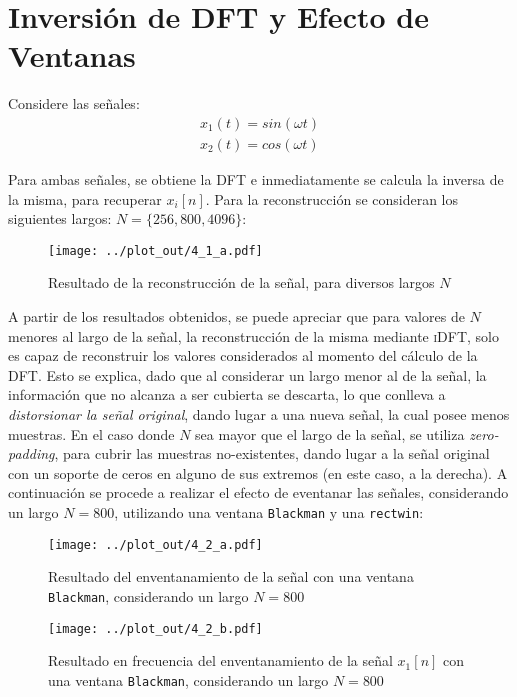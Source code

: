\section{Inversión de DFT y Efecto de Ventanas}
	Considere las señales:
	\begin{align}
		x_{1}(t) = sin( \omega t)\\
		x_{2}(t) = cos( \omega t) 
	\end{align}
	
	Para ambas señales, se obtiene la \textsc{DFT} e inmediatamente se calcula la inversa de la misma, para recuperar $x_{i}[n]$. Para la reconstrucción se consideran los siguientes largos: $N = \{ 256, 800, 4096 \}$:
		\begin{figure}[H]
			\center
			\texttt{[image: ../plot\_out/4\_1\_a.pdf]}
			\caption{Resultado de la reconstrucción de la señal, para diversos largos $N$}
			\label{fig:4_ns}
		\end{figure}
		
	A partir de los resultados obtenidos, se puede apreciar que para valores de $N$ menores al largo de la señal, la reconstrucción de la misma mediante \textsc{iDFT}, solo es capaz de reconstruir los valores considerados al momento del cálculo de la \textsc{DFT}. Esto se explica, dado que al considerar un largo menor al de la señal, la información que no alcanza a ser cubierta se descarta, lo que conlleva a \textit{distorsionar la señal original}, dando lugar a una nueva señal, la cual posee menos muestras. En el caso donde $N$ sea mayor que el largo de la señal, se utiliza \textit{zero-padding}, para cubrir las muestras no-existentes, dando lugar a la señal original con un soporte de ceros en alguno de sus extremos (en este caso, a la derecha). A continuación se procede a realizar el efecto de eventanar las señales, considerando un largo $N = 800$, utilizando una ventana \texttt{Blackman} y una \texttt{rectwin}: 
	\begin{figure}[H]
			\center
			\texttt{[image: ../plot\_out/4\_2\_a.pdf]}
			\caption{Resultado del enventanamiento de la señal con una ventana \texttt{Blackman}, considerando un largo $N = 800$}
			\label{fig:4_sample_blackman_800}
		\end{figure}
		
		
	\begin{figure}[H]
			\center
			\texttt{[image: ../plot\_out/4\_2\_b.pdf]}
			\caption{Resultado en frecuencia del enventanamiento de la señal $x_{1}[n]$ con una ventana \texttt{Blackman}, considerando un largo $N = 800$}
			\label{fig:4_blackman_800_1}
		\end{figure}
		
